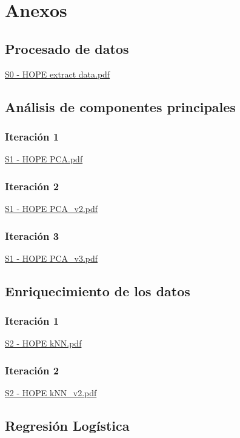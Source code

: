 \chapter{Anexos}
\label{chapter:anexos}


\section{Procesado de datos}
\label{anx01:procesado_datos}
\href{file://./anexos/S0 - HOPE extract data.pdf}{S0 - HOPE extract data.pdf}

\section{Análisis de componentes principales}
\label{anx02:pca}
\subsection{Iteración 1}
\label{anx02:pca1}
\href{file://./anexos/S1 - HOPE PCA.pdf}{S1 - HOPE PCA.pdf}

\subsection{Iteración 2}
\label{anx02:pca2}
\href{file://./anexos/S1 - HOPE PCA_v2.pdf}{S1 - HOPE PCA\_v2.pdf}

\subsection{Iteración 3}
\label{anx02:pca3}
\href{file://./anexos/S1 - HOPE PCA_v3.pdf}{S1 - HOPE PCA\_v3.pdf}

\section{Enriquecimiento de los datos}
\label{anx03:knn}
\subsection{Iteración 1}
\label{anx03:knn1}
\href{file://./anexos/S2 - HOPE kNN.pdf}{S2 - HOPE kNN.pdf}

\subsection{Iteración 2}
\label{anx03:knn2}
\href{file://./anexos/S2 - HOPE kNN_v2.pdf}{S2 - HOPE kNN\_v2.pdf}

\section{Regresión Logística}
\label{anx04:rl}
